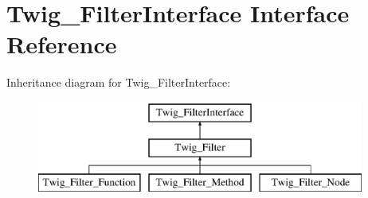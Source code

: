 \hypertarget{interfaceTwig__FilterInterface}{}\section{Twig\+\_\+\+Filter\+Interface Interface Reference}
\label{interfaceTwig__FilterInterface}
Inheritance diagram for Twig\+\_\+\+Filter\+Interface\+:\begin{figure}[H]
\begin{center}
\leavevmode
\includegraphics[height=3.000000cm]{interfaceTwig__FilterInterface}
\end{center}
\end{figure}
